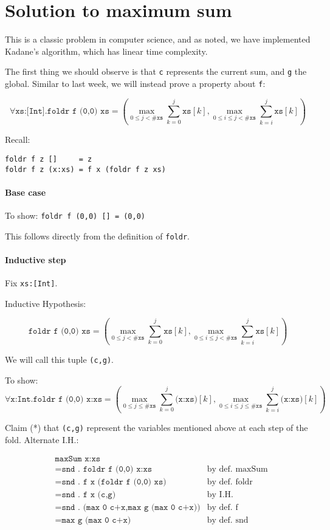 \documentclass[10pt,a4paper]{article}
\newcommand{\just}[2]{\texttt{#1} & \textrm{#2}}
\begin{document}
\newpage


\section{Solution to maximum sum}
This is a classic problem in computer science, and as noted,
we have implemented Kadane's algorithm, which has linear time complexity.

The first thing we should observe is that \texttt{c} represents the current sum, and \texttt{g} the global.
Similar to last week, we will instead prove a property about \texttt{f}:

\[ \forall \texttt{xs:[Int].foldr f (0,0) xs} = (\max_{0\le j < \texttt{\#xs}} \sum_{k=0}^{j} \texttt{xs}[k],\max_{0\le i \le j < \texttt{\#xs}} \sum_{k=i}^{j} \texttt{xs}[k]) \]

Recall:

\begin{lstlisting}
foldr f z []     = z
foldr f z (x:xs) = f x (foldr f z xs)
\end{lstlisting}

\paragraph{Base case}
To show: \texttt{foldr f (0,0) [] = (0,0)}

This follows directly from the definition of \texttt{foldr}.

\paragraph{Inductive step}
Fix \texttt{xs:[Int]}.

Inductive Hypothesis:

\[ \texttt{foldr f (0,0) xs} =
(\max_{0\le j < \texttt{\#xs}} \sum_{k=0}^{j} \texttt{xs}[k],
\max_{0\le i \le j < \texttt{\#xs}} \sum_{k=i}^{j} \texttt{xs}[k]) \]

We will call this tuple \texttt{(c,g)}.

To show:
\[ \forall \texttt{x:Int.foldr f (0,0) x:xs} =
(\max_{0\le j \le \texttt{\#xs}} \sum_{k=0}^{j} \texttt{(x:xs)}[k],
\max_{0\le i \le j \le \texttt{\#xs}} \sum_{k=i}^{j} \texttt{(x:xs)}[k]) \]

Claim (*) that \texttt{(c,g)} represent the variables mentioned above at each step of the fold. Alternate I.H.:

\begin{align*}
& \texttt{maxSum x:xs} \\
&= \just{snd . foldr f (0,0) x:xs}{by def. maxSum} \\
&= \just{snd . f x (foldr f (0,0) xs)}{by def. foldr} \\
&= \just{snd . f x (c,g)}{by I.H.} \\
&= \just{snd . (max 0 c+x,max g (max 0 c+x))}{by def. f} \\
&= \just{max g (max 0 c+x)}{by def. snd}
\end{align*}
\end{document}
